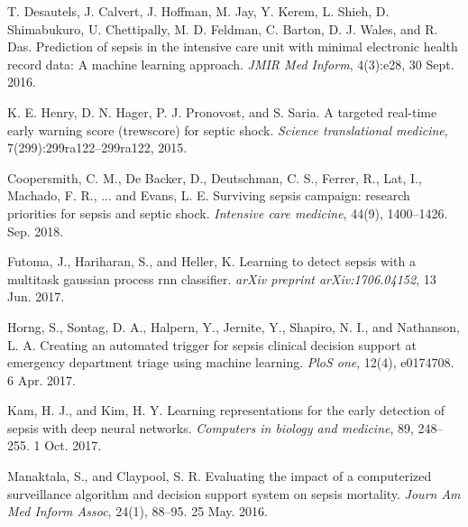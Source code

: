 \documentclass{amia}
\begin{document}
\makeatletter
\renewcommand{\@biblabel}[1]{\hfill #1.}
\makeatother



\begin{thebibliography}{1}
\setlength\itemsep{-0.1em}

	T. Desautels, J. Calvert, J. Hoffman, M. Jay, Y. Kerem, L. Shieh,
	D. Shimabukuro, U. Chettipally, M. D. Feldman, C. Barton, D. J. Wales,
	and R. Das. Prediction of sepsis in the intensive care unit with minimal
	electronic health record data: A machine learning approach. 
	{\it JMIR Med Inform}, 4(3):e28, 30 Sept. 2016.


	K. E. Henry, D. N. Hager, P. J. Pronovost, and S. Saria. A targeted
	real-time early warning score (trewscore) for septic shock. 
	{\it Science translational medicine}, 7(299):299ra122--299ra122, 2015.

        Coopersmith, C. M., De Backer, D., Deutschman, C. S., Ferrer, R., Lat, I., Machado, F. R., 
        ... and Evans, L. E. Surviving sepsis campaign: research priorities for sepsis and septic shock. 
        {\it Intensive care medicine}, 44(9), 1400--1426. Sep. 2018.

        Futoma, J., Hariharan, S., and Heller, K. Learning to detect sepsis with a multitask gaussian 
        process rnn classifier. {\it arXiv preprint arXiv:1706.04152}, 13 Jun. 2017.

        Horng, S., Sontag, D. A., Halpern, Y., Jernite, Y., Shapiro, N. I., and Nathanson, L. A. 
        Creating an automated trigger for sepsis clinical decision support at emergency department 
        triage using machine learning. {\it PloS one}, 12(4), e0174708. 6 Apr. 2017.

        Kam, H. J., and Kim, H. Y. Learning representations for the early detection of sepsis with deep neural 
        networks. {\it Computers in biology and medicine}, 89, 248--255. 1 Oct. 2017.

        Manaktala, S., and Claypool, S. R. Evaluating the impact of a computerized surveillance algorithm and 
        decision support system on sepsis mortality. {\it Journ Am Med Inform Assoc}, 
        24(1), 88--95. 25 May. 2016.


\end{thebibliography}
\end{document}
